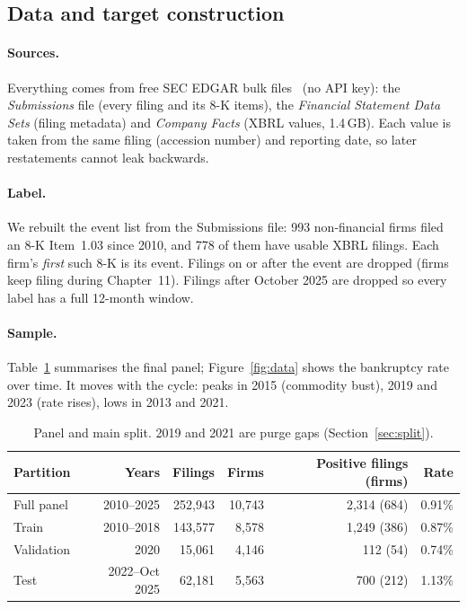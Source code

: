 \subsection{Data and target construction}

\paragraph{Sources.} Everything comes from free SEC EDGAR bulk files~\cite{secedgar} (no API key):
the \emph{Submissions} file (every filing and its 8-K items), the \emph{Financial Statement Data Sets}
(filing metadata) and \emph{Company Facts} (XBRL values, 1.4\,GB). Each value is taken from the same
filing (accession number) and reporting date, so later restatements cannot leak backwards.

\paragraph{Label.} We rebuilt the event list from the Submissions file: 993 non-financial firms filed an
8-K Item~1.03 since 2010, and 778 of them have usable XBRL filings. Each firm's \emph{first} such 8-K is its
event. Filings on or after the event are dropped (firms keep filing during Chapter~11). Filings after
October 2025 are dropped so every label has a full 12-month window.

\paragraph{Sample.} Table~\ref{tab:panel} summarises the final panel; Figure~\ref{fig:data} shows the
bankruptcy rate over time. It moves with the cycle: peaks in 2015 (commodity bust), 2019 and 2023 (rate
rises), lows in 2013 and 2021.

\begin{table}[htbp]
\centering
\small
\begin{tabular}{lrrrrr}
\toprule
Partition & Years & Filings & Firms & Positive filings (firms) & Rate \\
\midrule
Full panel & 2010--2025 & 252,943 & 10,743 & 2,314 (684) & 0.91\% \\
Train & 2010--2018 & 143,577 & 8,578 & 1,249 (386) & 0.87\% \\
Validation & 2020 & 15,061 & 4,146 & 112 (54) & 0.74\% \\
Test & 2022--Oct 2025 & 62,181 & 5,563 & 700 (212) & 1.13\% \\
\bottomrule
\end{tabular}
\caption{Panel and main split. 2019 and 2021 are purge gaps (Section~\ref{sec:split}).}
\label{tab:panel}
\end{table}

